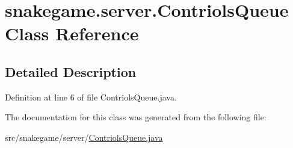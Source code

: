 \hypertarget{classsnakegame_1_1server_1_1_contriols_queue}{}\section{snakegame.\+server.\+Contriols\+Queue Class Reference}
\label{classsnakegame_1_1server_1_1_contriols_queue}


\subsection{Detailed Description}


Definition at line 6 of file Contriols\+Queue.\+java.



The documentation for this class was generated from the following file\+:\begin{DoxyCompactItemize}
\item 
src/snakegame/server/\mbox{\hyperlink{_contriols_queue_8java}{Contriols\+Queue.\+java}}\end{DoxyCompactItemize}
